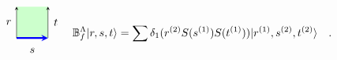 \documentclass[a4paper,11pt]{article}
\theoremstyle{theorem}
\theoremstyle{remark}
\newcommand{\Bf}{\mathbb{B}}
\newcommand{\cone}{(1)}
\newcommand{\ctwo}{(2)}
\begin{document}
\begin{equation}
\begin{aligned}
    \begin{tikzpicture}
    \begin{scope}[rotate=-90] %
        \fill[green!20] (0, 0) rectangle (1,1); %
        \draw[-stealth,blue,line width = 1.6pt] (1,0) -- (1,1);
        \draw[-stealth,black] (1,1) -- (0,1); 
                \draw[-stealth,black] (1,0) -- (0,0); 
        \node[ line width=0.2pt, dashed, draw opacity=0.5] (a) at (1.4,0.5){$s$};
        \node[ line width=0.2pt, dashed, draw opacity=0.5] (a) at (0.5,1.25){$t$};
            \node[ line width=0.2pt, dashed, draw opacity=0.5] (a) at (0.5,-.25){$r$};
    \end{scope}
\end{tikzpicture}   
\end{aligned}
\quad
\begin{aligned}
   &   \Bf_f^{\Lambda} |r,s,t\rangle= \sum \delta_1(r^{\ctwo} S(s^{\cone}) S(t^{(1)})) |r^{\cone},s^{\ctwo},t^{\ctwo}\rangle
\end{aligned}.
\end{equation}
\end{document}
